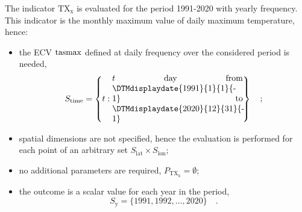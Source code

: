 \begin{example}
  The \gls{indicator} $\mathrm{TX_x}$ is evaluated for the period 1991-2020 with yearly frequency. This \gls{indicator} is the monthly maximum value of daily maximum temperature,\cite{ETCCDIClimate} hence:
  \begin{itemize}
    \item the \gls{ECV} $\mathrm{tasmax}$ defined at daily frequency over the considered period is needed,
      \begin{equation*}
        S_\text{time} = \left\{ t : \parbox{0.45\linewidth}{$t$ day from \DTMdisplaydate{1991}{1}{1}{-1} to \DTMdisplaydate{2020}{12}{31}{-1}} \right\}
        \quad ;
      \end{equation*}
    \item spatial dimensions are not specified, hence the evaluation is performed for each point of an arbitrary set $S_\text{lat} \times S_\text{lon}$;
    \item no additional parameters are required, $P_\mathrm{TX_x} = \emptyset$;
    \item the outcome is a scalar value for each year in the period,
      \begin{equation*}
        S_\text{y} = \{ 1991, 1992, \dots, 2020 \}
        \quad .
      \end{equation*}
  \end{itemize}
\end{example}
